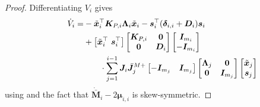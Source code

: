 \documentclass[../main.tex]{subfiles}
\begin{document}
\begin{proof}
    Differentiating $V_i$ gives
    \begin{equation}
        \begin{split}
            \dot{V}_i
            =& - \tilde{\bm{x}}_i^\top  \bm{K}_{P,i} \bm{\Lambda}_i \tilde{\bm{x}}_i - \bm{s}_i^\top( \bm{\delta}_{i,i} + \bm{D}_i) \bm{s}_i \\
            &+ \left[ \tilde{\bm{x}}_i^\top \ \bm{s}_i^\top \right]
            \begin{bmatrix}
                \bm{K}_{P,i} & \bm{0} \\ \bm{0} & \bm{D}_i
            \end{bmatrix}
            \begin{bmatrix}
                \bm{I}_{m_i} \\ -\bm{I}_{m_i}
            \end{bmatrix} \\
            &\qquad \cdot
            \sum_{j=1}^{i-1}
                \bm{J}_i \bar{\bm{J}}_j^{M+}
            \begin{bmatrix}
                -\bm{I}_{m_j} & \bm{I}_{m_j}
            \end{bmatrix}
            \begin{bmatrix}
                \bm{\Lambda}_j & \bm{0} \\ \bm{0} & \bm{I}_{m_j}
            \end{bmatrix}
            \begin{bmatrix}
                \tilde{\bm{x}}_j \\ \bm{s}_j
            \end{bmatrix}\mspace{-36mu}
        \end{split}
    \end{equation}
    using  and the fact that $\dot{\bar{\bm{M}}}_i-2\bm{\mu}_{i,i}$ is skew-symmetric.

\end{proof}
\end{document}
